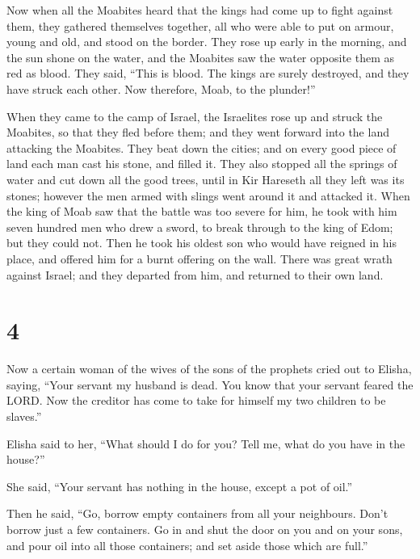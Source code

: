  Now when all the Moabites heard that the kings had come up
to fight against them, they gathered themselves together, all who were
able to put on armour, young and old, and stood on the border.
 They rose up early in the morning, and the sun shone on
the water, and the Moabites saw the water opposite them as red as blood.
 They said, ``This is blood. The kings are surely
destroyed, and they have struck each other. Now therefore, Moab, to the
plunder!''

 When they came to the camp of Israel, the Israelites rose
up and struck the Moabites, so that they fled before them; and they went
forward into the land attacking the Moabites.  They beat
down the cities; and on every good piece of land each man cast his
stone, and filled it. They also stopped all the springs of water and cut
down all the good trees, until in Kir Hareseth all they left was its
stones; however the men armed with slings went around it and attacked
it.  When the king of Moab saw that the battle was too
severe for him, he took with him seven hundred men who drew a sword, to
break through to the king of Edom; but they could not. 
Then he took his oldest son who would have reigned in his place, and
offered him for a burnt offering on the wall. There was great wrath
against Israel; and they departed from him, and returned to their own
land.

\hypertarget{section-3}{%
\section{4}\label{section-3}}

 Now a certain woman of the wives of the sons of the
prophets cried out to Elisha, saying, ``Your servant my husband is dead.
You know that your servant feared the LORD. Now the creditor has come to
take for himself my two children to be slaves.''

 Elisha said to her, ``What should I do for you? Tell me,
what do you have in the house?''

She said, ``Your servant has nothing in the house, except a pot of
oil.''

 Then he said, ``Go, borrow empty containers from all your
neighbours. Don't borrow just a few containers.  Go in and
shut the door on you and on your sons, and pour oil into all those
containers; and set aside those which are full.''


